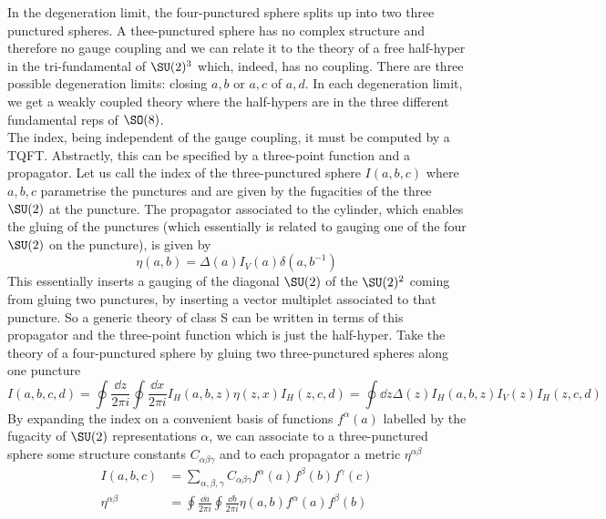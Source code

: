 In the degeneration limit, the four-punctured sphere splits up into two three punctured spheres. A thee-punctured sphere has no complex structure and therefore no gauge coupling and we can relate it to the theory of a free half-hyper in the tri-fundamental of $\SU(2)^{3}$ which, indeed, has no coupling. There are three possible degeneration limits: closing $a,b$ or $a,c$ of $a,d$. In each degeneration limit, we get a weakly coupled theory where the half-hypers are in the three different fundamental reps of $\SO(8)$.\\
The index, being independent of the gauge coupling, it must be computed by a TQFT. Abstractly, this can be specified by a three-point function and a propagator. Let us call the index of the three-punctured sphere $I(a,b,c)$ where $a,b,c$ parametrise the punctures and are given by the fugacities of the three $\SU(2)$ at the puncture. The propagator associated to the cylinder, which enables the gluing of the punctures (which essentially is related to gauging one of the four $\SU(2)$ on the puncture), is given by
\begin{equation}
	\eta(a,b)=\Delta(a)I_{V}(a)\delta(a,b^{-1})
\end{equation}
This essentially inserts a gauging of the diagonal $\SU(2)$ of the $\SU(2)^{2}$ coming from gluing two punctures, by inserting a vector multiplet associated to that puncture. So a generic theory of class S can be written in terms of this propagator and the three-point function which is just the half-hyper. Take the theory of a four-punctured sphere by gluing two three-punctured spheres along one puncture
\begin{equation}
	I(a,b,c,d)=\oint\frac{\dd{z}}{2\pi i}\oint\frac{\dd{x}}{2\pi i}I_{H}(a,b,z)\eta(z,x)I_{H}(z,c,d)=\oint\dd{z}\Delta (z)I_{H}(a,b,z)I_{V}(z)I_{H}(z,c,d)
\end{equation}
By expanding the index on a convenient basis of functions $f^{\alpha}(a)$ labelled by the fugacity of $\SU(2)$ representations $\alpha$, we can associate to a three-punctured sphere some structure constants $C_{\alpha\beta\gamma}$ and to each propagator a metric $\eta^{\alpha\beta}$
\begin{equation}
\begin{split}
	I(a,b,c)&=\sum_{\alpha,\beta,\gamma}C_{\alpha\beta\gamma}f^{\alpha}(a)f^{\beta}(b)f^{\gamma}(c)\\
	\eta^{\alpha\beta}&=\oint\frac{\dd{a}}{2\pi i}\oint\frac{\dd{b}}{2\pi i}\eta(a,b)f^{\alpha}(a)f^{\beta}(b)
\end{split}
\end{equation}
